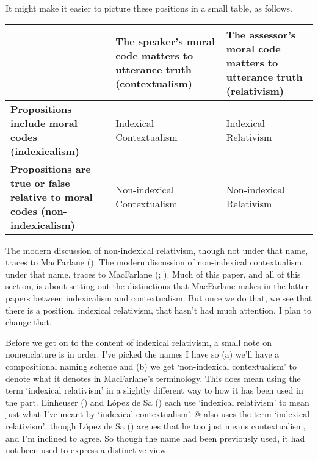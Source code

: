 \documentclass[
  11pt,
  letterpaper,
  DIV=11,
  numbers=noendperiod,
  twoside]{scrartcl}
\begin{document}
It might make it easier to picture these positions in a small table, as
follows.

\begin{longtable}[]{@{}
  >{\centering\arraybackslash}p{}
  >{\centering\arraybackslash}p{}
  >{\centering\arraybackslash}p{}@{}}
\toprule\noalign{}
\begin{minipage}[b]{\linewidth}\centering
\end{minipage} & \begin{minipage}[b]{\linewidth}\centering
\textbf{The speaker's moral code matters to utterance truth
(contextualism)}
\end{minipage} & \begin{minipage}[b]{\linewidth}\centering
\textbf{The assessor's moral code matters to utterance truth
(relativism)}
\end{minipage} \\
\midrule\noalign{}
\endhead
\bottomrule\noalign{}
\endlastfoot
\textbf{Propositions include moral codes (indexicalism)} & Indexical
Contextualism & Indexical Relativism \\
\textbf{Propositions are true or false relative to moral codes
(non-indexicalism)} & Non-indexical Contextualism & Non-indexical
Relativism \\
\end{longtable}

The modern discussion of non-indexical relativism, though not under that
name, traces to MacFarlane
(). The modern discussion of
non-indexical contextualism, under that name, traces to MacFarlane
(;
). Much of this paper, and all
of this section, is about setting out the distinctions that MacFarlane
makes in the latter papers between indexicalism and contextualism. But
once we do that, we see that there is a position, indexical relativism,
that hasn't had much attention. I plan to change that.

Before we get on to the content of indexical relativism, a small note on
nomenclature is in order. I've picked the names I have so (a) we'll have
a compositional naming scheme and (b) we get `non-indexical
contextualism' to denote what it denotes in MacFarlane's terminology.
This does mean using the term `indexical relativism' in a slightly
different way to how it has been used in the part. Einheuser
() and López de Sa
() each use `indexical relativism' to
mean just what I've meant by `indexical contextualism'.
@\cite{Kolbel2009-KLBTEF} also uses the term `indexical relativism',
though López de Sa () argues that he
too just means contextualism, and I'm inclined to agree. So though the
name had been previously used, it had not been used to express a
distinctive view.
\end{document}
